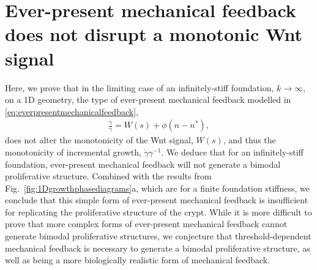  


\appendix
\section{Ever-present mechanical feedback does not disrupt a monotonic Wnt signal}
\label{app:everpresentmechanicalfeedbackproof}
Here, we prove that in the limiting case of an infinitely-stiff foundation, $k \to \infty$, on a 1D geometry, the type of ever-present mechanical feedback modelled in \eqref{eq:everpresentmechanicalfeedback},
\begin{align*}
\frac{\dot{\gamma}}{\gamma} = W(s) + \phi(n - n^*),
\end{align*}
does not alter the monotonicity of the Wnt signal, $W(s)$, and thus the monotonicity of incremental growth, $\dot{\gamma}\gamma^{-1}$. We deduce that for an infinitely-stiff foundation, ever-present mechanical feedback will not generate a bimodal proliferative structure. Combined with the results from Fig.\ \ref{fig:1Dgrowthphasediagrams}a, which are for a finite foundation stiffness, we conclude that this simple form of ever-present mechanical feedback is insufficient for replicating the proliferative structure of the crypt. While it is more difficult to prove that more complex forms of ever-present mechanical feedback cannot generate bimodal proliferative structures, we conjecture that threshold-dependent mechanical feedback is necessary to generate a bimodal proliferative structure, as well as being a more biologically realistic form of mechanical feedback. 

